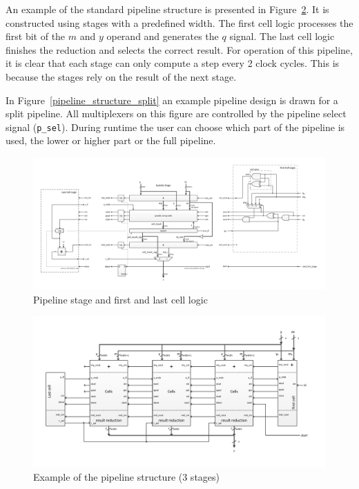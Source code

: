 An example of the standard pipeline structure is presented in Figure~\ref{pipeline_structure}. It is constructed using
stages with a predefined width. The first cell logic processes the first bit of the $m$ and $y$ operand and generates
the $q$ signal. The last cell logic finishes the reduction and selects the correct result. For operation of this
pipeline, it is clear that each stage can only compute a step every 2 clock cycles. This is because the stages rely on
the result of the next stage.

In Figure~\ref{pipeline_structure_split} an example pipeline design is drawn for a split pipeline. All multiplexers on
this figure are controlled by the pipeline select signal (\verb|p_sel|). During runtime the user can choose which part
of the pipeline is used, the lower or higher part or the full pipeline.

\newpage 
\begin{figure}[H]
\centering
\includegraphics[trim=1.2cm 1.2cm 1.2cm 1.2cm, width=25cm, angle=90]{pictures/sys_stage.pdf}
\caption{Pipeline stage and first and last cell logic}
\label{stage_structure}
\end{figure}
\newpage

\newpage 
\begin{figure}[H]
\centering
\includegraphics[trim=1.2cm 1.2cm 1.2cm 1.2cm, width=25cm, angle=90]{pictures/sys_pipeline_notsplit.pdf}
\caption{Example of the pipeline structure (3 stages)}
\label{pipeline_structure}
\end{figure}
\newpage

